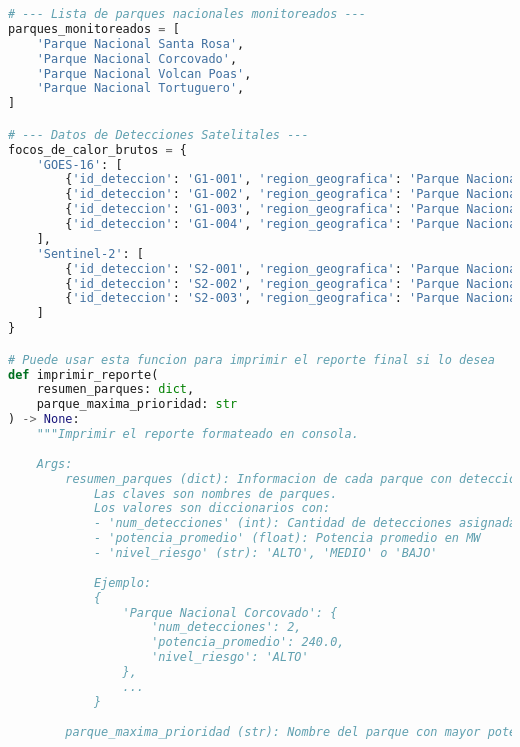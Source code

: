 \documentclass[11pt,a4paper]{article}
\begin{document}
\begin{lstlisting}[language=Python]
# --- Lista de parques nacionales monitoreados ---
parques_monitoreados = [
    'Parque Nacional Santa Rosa',
    'Parque Nacional Corcovado',
    'Parque Nacional Volcan Poas',
    'Parque Nacional Tortuguero',
]

# --- Datos de Detecciones Satelitales ---
focos_de_calor_brutos = {
    'GOES-16': [
        {'id_deteccion': 'G1-001', 'region_geografica': 'Parque Nacional Santa Rosa', 'potencia_mw': 200.0, 'timestamp': '2025-10-11T14:30:00Z'},
        {'id_deteccion': 'G1-002', 'region_geografica': 'Parque Nacional Corcovado', 'potencia_mw': 180.0, 'timestamp': '2025-10-11T14:32:00Z'},
        {'id_deteccion': 'G1-003', 'region_geografica': 'Parque Nacional Volcan Poas', 'potencia_mw': 50.0, 'timestamp': '2025-10-11T14:35:00Z'},
        {'id_deteccion': 'G1-004', 'region_geografica': 'Parque Nacional Tortuguero', 'potencia_mw': 100.0, 'timestamp': '2025-10-11T14:42:00Z'},
    ],
    'Sentinel-2': [
        {'id_deteccion': 'S2-001', 'region_geografica': 'Parque Nacional Tortuguero', 'potencia_mw': 120.0, 'timestamp': '2025-10-11T15:01:00Z'},
        {'id_deteccion': 'S2-002', 'region_geografica': 'Parque Nacional Tortuguero', 'potencia_mw': 150.0, 'timestamp': '2025-10-11T15:04:00Z'},
        {'id_deteccion': 'S2-003', 'region_geografica': 'Parque Nacional Corcovado', 'potencia_mw': 300.0, 'timestamp': '2025-10-11T15:10:00Z'},
    ]
}

# Puede usar esta funcion para imprimir el reporte final si lo desea
def imprimir_reporte(
    resumen_parques: dict,
    parque_maxima_prioridad: str
) -> None:
    """Imprimir el reporte formateado en consola.
    
    Args:
        resumen_parques (dict): Informacion de cada parque con detecciones.
            Las claves son nombres de parques.
            Los valores son diccionarios con:
            - 'num_detecciones' (int): Cantidad de detecciones asignadas
            - 'potencia_promedio' (float): Potencia promedio en MW
            - 'nivel_riesgo' (str): 'ALTO', 'MEDIO' o 'BAJO'
            
            Ejemplo:
            {
                'Parque Nacional Corcovado': {
                    'num_detecciones': 2,
                    'potencia_promedio': 240.0,
                    'nivel_riesgo': 'ALTO'
                },
                ...
            }
        
        parque_maxima_prioridad (str): Nombre del parque con mayor potencia promedio.
    

\end{lstlisting}
\end{document}
